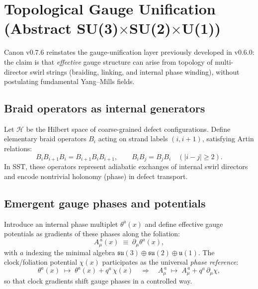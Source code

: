 \documentclass[10pt]{article}
\begin{document}
    \section{Topological Gauge Unification (Abstract SU(3)$\times$SU(2)$\times$U(1))}
    \label{sec:gauge_unification}

Canon v0.7.6 reinstates the gauge-unification layer previously developed in v0.6.0:
the claim is that \emph{effective} gauge structure can arise from topology of
multi-director swirl strings (braiding, linking, and internal phase winding),
without postulating fundamental Yang--Mills fields.

\subsection{Braid operators as internal generators}

Let $\mathcal{H}$ be the Hilbert space of coarse-grained defect configurations.
Define elementary braid operators $B_i$ acting on strand labels $(i,i+1)$,
satisfying Artin relations:
\begin{equation}
    B_i B_{i+1} B_i = B_{i+1} B_i B_{i+1},
    \qquad
    B_i B_j = B_j B_i \quad (|i-j|\ge 2).
\end{equation}
In SST, these operators represent adiabatic exchanges of internal swirl directors
and encode nontrivial holonomy (phase) in defect transport.

\subsection{Emergent gauge phases and potentials}

Introduce an internal phase multiplet $\theta^a(x)$ and define effective gauge
potentials as gradients of these phases along the foliation:
\begin{equation}
    A_\mu^{\,a}(x) \;\equiv\; \partial_\mu \theta^a(x),
\end{equation}
with $a$ indexing the minimal algebra
$\mathfrak{su}(3)\oplus\mathfrak{su}(2)\oplus\mathfrak{u}(1)$.
The clock/foliation potential $\chi(x)$ participates as the universal
\emph{phase reference}:
\begin{equation}
    \theta^a(x) \;\mapsto\; \theta^a(x) + q^a\,\chi(x)
    \quad\Rightarrow\quad
    A_\mu^{\,a} \;\mapsto\; A_\mu^{\,a} + q^a\,\partial_\mu \chi,
\end{equation}
so that clock gradients shift gauge phases in a controlled way.
\end{document}
